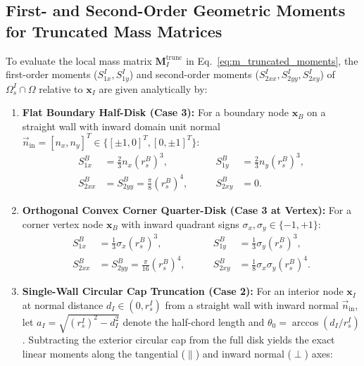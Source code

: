 \documentclass[VANCOUVER,Times1COL]{WileyNJD-v5}
\begin{document}
\subsection{First- and Second-Order Geometric Moments for Truncated Mass Matrices}
To evaluate the local mass matrix $\mathbf{M}_I^{\mathrm{trunc}}$ in Eq.~\eqref{eq:m_truncated_moments}, the first-order moments ($S_{1x}^I, S_{1y}^I$) and second-order moments ($S_{2xx}^I, S_{2yy}^I, S_{2xy}^I$) of $\Omega_s^I \cap \Omega$ relative to $\mathbf{x}_I$ are given analytically by:
\begin{enumerate}
    \item \textbf{Flat Boundary Half-Disk (Case 3):} For a boundary node $\mathbf{x}_B$ on a straight wall with inward domain unit normal $\vec{n}_{\mathrm{in}} = [n_x, n_y]^T \in \{[\pm 1, 0]^T, [0, \pm 1]^T\}$:
          \begin{equation}
              \begin{aligned}
                  S_{1x}^B  & = \frac{2}{3} n_x (r_s^B)^3, \qquad           & S_{1y}^B  & = \frac{2}{3} n_y (r_s^B)^3, \\
                  S_{2xx}^B & = S_{2yy}^B = \frac{\pi}{8} (r_s^B)^4, \qquad & S_{2xy}^B & = 0.
              \end{aligned}
          \end{equation}
    \item \textbf{Orthogonal Convex Corner Quarter-Disk (Case 3 at Vertex):} For a corner vertex node $\mathbf{x}_B$ with inward quadrant signs $\sigma_x, \sigma_y \in \{-1, +1\}$:
          \begin{equation}
              \begin{aligned}
                  S_{1x}^B  & = \frac{1}{3} \sigma_x (r_s^B)^3, \qquad       & S_{1y}^B  & = \frac{1}{3} \sigma_y (r_s^B)^3,           \\
                  S_{2xx}^B & = S_{2yy}^B = \frac{\pi}{16} (r_s^B)^4, \qquad & S_{2xy}^B & = \frac{1}{8} \sigma_x \sigma_y (r_s^B)^4.
              \end{aligned}
          \end{equation}
    \item \textbf{Single-Wall Circular Cap Truncation (Case 2):} For an interior node $\mathbf{x}_I$ at normal distance $d_I \in (0, r_s^I)$ from a straight wall with inward normal $\vec{n}_{\mathrm{in}}$, let $a_I = \sqrt{(r_s^I)^2 - d_I^2}$ denote the half-chord length and $\theta_0 = \arccos(d_I / r_s^I)$. Subtracting the exterior circular cap from the full disk yields the exact linear moments along the tangential ($\parallel$) and inward normal ($\perp$) axes:

\end{enumerate}
\end{document}
